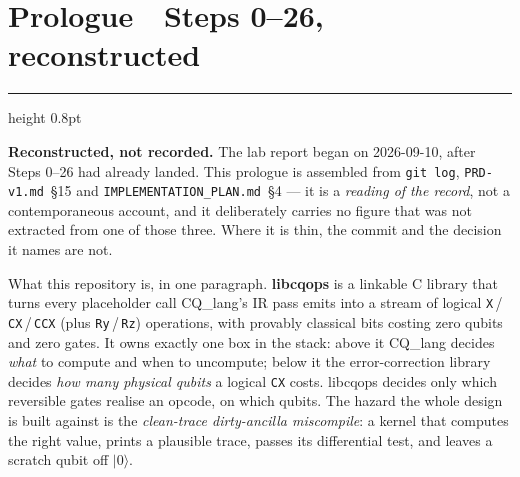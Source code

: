 
\clearpage
\section*{Prologue \,\textcolor{cqrule}{\textbar}\, Steps 0--26, reconstructed}
\vspace{-2pt}\textcolor{cqrule}{\hrule height 0.8pt}\vspace{10pt}

\noindent\colorbox{cqbg}{%
\begin{minipage}{\dimexpr\linewidth-2\fboxsep}
\vspace{2mm}
\small{\bfseries Reconstructed, not recorded.} The lab report began on
2026-09-10, after Steps 0--26 had already landed. This prologue is assembled
from \texttt{git log}, \texttt{PRD-v1.md}~§15 and
\texttt{IMPLEMENTATION\_PLAN.md}~§4 --- it is a \emph{reading of the record},
not a contemporaneous account, and it deliberately carries no figure that was
not extracted from one of those three. Where it is thin, the commit and the
decision it names are not.
\vspace{2mm}
\end{minipage}}

\vspace{10pt}

\noindent What this repository is, in one paragraph. \textbf{libcqops} is a
linkable C library that turns every placeholder call CQ\_lang's IR pass emits
into a stream of logical \texttt{X}\,/\,\texttt{CX}\,/\,\texttt{CCX} (plus
\texttt{Ry}\,/\,\texttt{Rz}) operations, with provably classical bits costing
zero qubits and zero gates. It owns exactly one box in the stack: above it
CQ\_lang decides \emph{what} to compute and when to uncompute; below it the
error-correction library decides \emph{how many physical qubits} a logical
\texttt{CX} costs. libcqops decides only which reversible gates realise an
opcode, on which qubits. The hazard the whole design is built against is the
\emph{clean-trace dirty-ancilla miscompile}: a kernel that computes the right
value, prints a plausible trace, passes its differential test, and leaves a
scratch qubit off $\lvert 0\rangle$.

